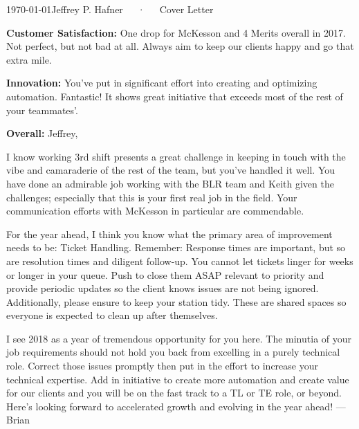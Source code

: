 \documentclass[11pt, letterpaper]{awesome-cv}
\begin{document}
\makecvheader[R]

\makecvfooter
  {\today}{Jeffrey P. Hafner~~~·~~~Cover Letter}{}

\makelettertitle

\begin{cvletter}


    {\bfseries Customer Satisfaction:} One drop for McKesson and 4 Merits overall in 2017. 
    Not perfect, but not bad at all. 
    Always aim to keep our clients happy and go that extra mile.

    {\bfseries Innovation:} You've put in significant effort into creating and optimizing automation. 
    Fantastic! 
    It shows great initiative that exceeds most of the rest of your teammates'.

    {\bfseries Overall:}
Jeffrey,

I know working 3rd shift presents a great challenge in keeping in touch with the vibe and camaraderie of the rest of the team, but you've handled it well.
You have done an admirable job working with the BLR team and Keith given the challenges; especially that this is your first real job in the field.
Your communication efforts with McKesson in particular are commendable.

For the year ahead, I think you know what the primary area of improvement needs to be: Ticket Handling.
Remember: Response times are important, but so are resolution times and diligent follow-up.
You cannot let tickets linger for weeks or longer in your queue.
Push to close them ASAP relevant to priority and provide periodic updates so the client knows issues are not being ignored.
Additionally, please ensure to keep your station tidy.
These are shared spaces so everyone is expected to clean up after themselves.

I see 2018 as a year of tremendous opportunity for you here.
The minutia of your job requirements should not hold you back from excelling in a purely technical role.
Correct those issues promptly then put in the effort to increase your technical expertise.
Add in initiative to create more automation and create value for our clients and you will be on the fast track to a TL or TE role, or beyond.
Here's looking forward to accelerated growth and evolving in the year ahead!
---Brian
\end{cvletter}


\makeletterclosing

\end{document}

